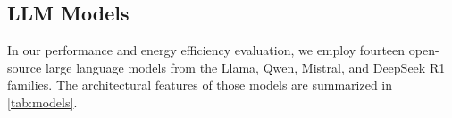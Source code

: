 \subsection{LLM Models}
\label{chap:methods:sec:models}

In our performance and energy efficiency evaluation, we employ fourteen open-source large language models from the Llama\cite{grattafiori2024llama,meta2025llama4}, Qwen\cite{yang2024qwen2,yang2025qwen3}, Mistral\cite{jiang2024mistral}, and DeepSeek R1\cite{guo2025deepseek} families.
The architectural features of those models are summarized in \ref{tab:models}.

